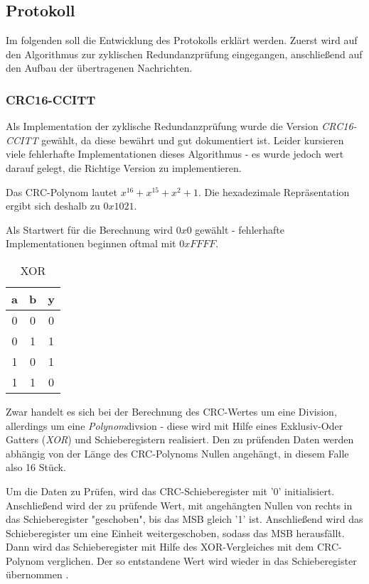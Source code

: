 \subsection{Protokoll}

Im folgenden soll die Entwicklung des Protokolls erklärt werden. Zuerst wird auf den Algorithmus zur zyklischen Redundanzprüfung eingegangen,
anschließend auf den Aufbau der übertragenen Nachrichten.

\subsubsection{CRC16-CCITT}

Als Implementation der zyklische Redundanzprüfung wurde die Version \textit{CRC16-CCITT} gewählt, da diese bewährt und gut dokumentiert ist. Leider 
kursieren viele fehlerhafte Implementationen dieses Algorithmus - es wurde jedoch wert darauf gelegt, die Richtige Version zu implementieren.

\smallskip

Das CRC-Polynom lautet $x^{16}+x^{15}+x^2+1$. Die hexadezimale Repräsentation ergibt sich deshalb zu $0x1021$.
\smallskip

Als Startwert für die Berechnung wird $0x0$ gewählt - fehlerhafte Implementationen beginnen oftmal mit $0xFFFF$. 

\begin{wraptable}{l}{30mm} 
    \centering
\begin{tabular}{ |c | c | c | }
    \hline
    a & b & y \\
    \hline \hline
    0 & 0 & 0 \\
    \hline
    0 & 1 & 1 \\
    \hline
    1 & 0 & 1 \\
    \hline
    1 & 1 & 0 \\
    \hline
\end{tabular}
\caption{XOR}
\end{wraptable}

\smallskip

Zwar handelt es sich bei der Berechnung des CRC-Wertes um eine Division, allerdings um eine \textit{Polynom}divsion - diese wird mit Hilfe eines Exklusiv-Oder
Gatters (\textit{XOR}) und Schieberegistern realisiert. Den zu prüfenden Daten werden abhängig von der Länge des CRC-Polynoms Nullen angehängt, in diesem Falle also 
16 Stück.

\smallskip

Um die Daten zu Prüfen, wird das CRC-Schieberegister mit '0' initialisiert. Anschließend wird der zu prüfende Wert, mit angehängten Nullen von rechts
in das Schieberegister "geschoben", bis das \ac{MSB} gleich '1' ist. Anschließend wird das Schieberegister um eine Einheit weitergeschoben, sodass das \ac{MSB}
herausfällt. Dann wird das Schieberegister mit Hilfe des XOR-Vergleiches mit dem CRC-Polynom verglichen. Der so entstandene Wert wird wieder in das Schieberegister
übernommen \citep{IK_VL}. 

